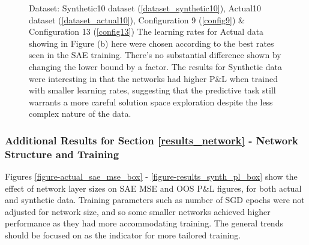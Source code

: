 \documentclass[a4paper,11pt,oneside]{article}
\theoremstyle{plain}
\theoremstyle{definition}
\begin{document}
\begin{figure}[H]
\begin{subfigure}{.5\textwidth}
{				\newline }
			\label{figure-actual_pl_minmax_lr}
		\end{subfigure}
		\caption[P\&L by Learning Rates]{Dataset: Synthetic10 dataset (\ref{dataset_synthetic10}), Actual10 dataset (\ref{dataset_actual10}), Configuration 9 (\ref{config9}) \& Configuration 13 (\ref{config13})
			\newline The learning rates for Actual data showing in Figure (b) here were chosen according to the best rates seen in the SAE training. There's no substantial difference shown by changing the lower bound by a factor. The results for Synthetic data were interesting in that the networks had higher P\&L when trained with smaller learning rates, suggesting that the predictive task still warrants a more careful solution space exploration despite the less complex nature of the data.}
		\label{figure-pl_lr}
	\end{figure}
	
	
	
	
	
	
	
	
	
	\subsubsection{Additional Results for Section \ref{results_network} - Network Structure and Training }\label{results_network_appendix}
	
	Figures \ref{figure-actual_sae_mse_box} - \ref{figure-results_synth_pl_box} show the effect of network layer sizes on SAE MSE and OOS P\&L figures, for both actual and synthetic data. Training parameters such as number of SGD epochs were not adjusted for network size, and so some smaller networks achieved higher performance as they had more accommodating training. The general trends should be focused on as the indicator for more tailored training.
	
\end{document}
